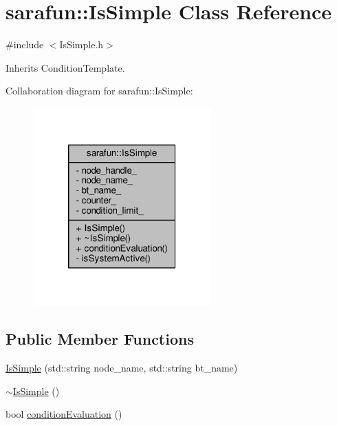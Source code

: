 \hypertarget{classsarafun_1_1IsSimple}{\section{sarafun\-:\-:Is\-Simple Class Reference}
\label{classsarafun_1_1IsSimple}
}


{\ttfamily \#include $<$Is\-Simple.\-h$>$}



Inherits Condition\-Template.



Collaboration diagram for sarafun\-:\-:Is\-Simple\-:\nopagebreak
\begin{figure}[H]
\begin{center}
\leavevmode
\includegraphics[width=194pt]{de/d41/classsarafun_1_1IsSimple__coll__graph}
\end{center}
\end{figure}
\subsection*{Public Member Functions}
\begin{DoxyCompactItemize}
\item 
\hyperlink{classsarafun_1_1IsSimple_a299c558037426826c95bfc54dbe1a399_a299c558037426826c95bfc54dbe1a399}{Is\-Simple} (std\-::string node\-\_\-name, std\-::string bt\-\_\-name)
\item 
\hyperlink{classsarafun_1_1IsSimple_a90b55180452143b098bfa0f5a184ee58_a90b55180452143b098bfa0f5a184ee58}{$\sim$\-Is\-Simple} ()
\item 
bool \hyperlink{classsarafun_1_1IsSimple_aa57bb3baf9d3ac955e5fdfd5351d45a0_aa57bb3baf9d3ac955e5fdfd5351d45a0}{condition\-Evaluation} ()
\end{DoxyCompactItemize}
